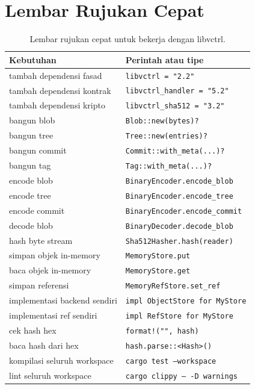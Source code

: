 \documentclass[11pt,a4paper]{article}
\begin{document}
\section{Lembar Rujukan Cepat}

\begin{table}[H]
	\centering
	\caption{Lembar rujukan cepat untuk bekerja dengan libvctrl.}
	\label{tab:cheat}
	\footnotesize
	\begin{tabularx}{\textwidth}{l X}
		\toprule
		Kebutuhan                    & Perintah atau tipe                    \\
		\midrule
		tambah dependensi fasad      & \texttt{libvctrl = "2.2"}             \\
		tambah dependensi kontrak    & \texttt{libvctrl\_handler = "5.2"}    \\
		tambah dependensi kripto     & \texttt{libvctrl\_sha512 = "3.2"}     \\
		bangun blob                  & \texttt{Blob::new(bytes)?}            \\
		bangun tree                  & \texttt{Tree::new(entries)?}          \\
		bangun commit                & \texttt{Commit::with\_meta(...)?}     \\
		bangun tag                   & \texttt{Tag::with\_meta(...)?}        \\
		encode blob                  & \texttt{BinaryEncoder.encode\_blob}   \\
		encode tree                  & \texttt{BinaryEncoder.encode\_tree}   \\
		encode commit                & \texttt{BinaryEncoder.encode\_commit} \\
		decode blob                  & \texttt{BinaryDecoder.decode\_blob}   \\
		hash byte stream             & \texttt{Sha512Hasher.hash(reader)}    \\
		simpan objek in-memory       & \texttt{MemoryStore.put}              \\
		baca objek in-memory         & \texttt{MemoryStore.get}              \\
		simpan referensi             & \texttt{MemoryRefStore.set\_ref}      \\
		implementasi backend sendiri & \texttt{impl ObjectStore for MyStore} \\
		implementasi ref sendiri     & \texttt{impl RefStore for MyStore}    \\
		cek hash hex                 & \texttt{format!("{}", hash)}          \\
		baca hash dari hex           & \texttt{hash.parse::<Hash>()}         \\
		kompilasi seluruh workspace  & \texttt{cargo test --workspace}       \\
		lint seluruh workspace       & \texttt{cargo clippy -- -D warnings}  \\
		\bottomrule
	\end{tabularx}
\end{table}
\end{document}
